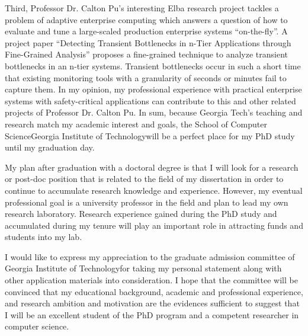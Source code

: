 \documentclass[a4paper,10pt]{report}
\newcommand{\university}{Georgia Institute of Technology}
\newcommand{\department}{School of Computer Science}
\newcommand{\uniabbre}{Georgia Tech}
\begin{document}
\vspace{0.2cm}
Third, Professor Dr. Calton Pu's interesting Elba research project tackles a problem of adaptive enterprise computing which answers a question of how to evaluate and tune a large-scaled production enterprise systems ``on-the-fly''. A project paper ``Detecting Transient Bottlenecks in n-Tier Applications through Fine-Grained Analysis'' proposes a fine-grained technique to analyze transient bottlenecks in an n-tier systems. Transient bottlenecks occur in such a short time that existing monitoring tools with a granularity of seconds or minutes fail to capture them. In my opinion, my professional experience with practical enterprise systems with safety-critical applications can contribute to this and other related projects of Professor Dr. Calton Pu. In sum, because \uniabbre's teaching and research match my academic interest and goals, the \department \university \space will be a perfect place for my PhD study until my graduation day.

\vspace{0.2cm}
My plan after graduation with a doctoral degree is that I will look for a research or post-doc position that is related to the field of my dissertation in order to continue to accumulate research knowledge and experience. However, my eventual professional goal is a university professor in the field and plan to lead my own research laboratory. Research experience gained during the PhD study and accumulated during my tenure will play an important role in attracting funds and students into my lab.

\vspace{0.2cm}
I would like to express my appreciation to the graduate admission committee of \university \space for taking my personal statement along with other application materials into consideration. I hope that the committee will be convinced that my educational background, academic and professional experience, and research ambition and motivation are the evidences sufficient to suggest that I will be an excellent student of the PhD program and a competent researcher in computer science.
\end{document}
